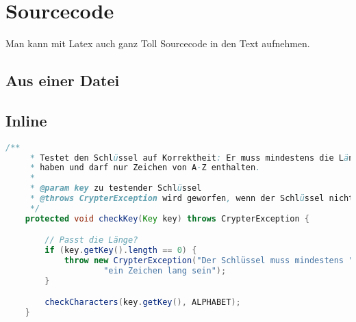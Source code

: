 \section{Sourcecode}

Man kann mit Latex auch ganz Toll Sourcecode in den Text aufnehmen.

\subsection{Aus einer Datei}




\subsection{Inline}

\begin{lstlisting}[language=Java]
    /**
     * Testet den Schlüssel auf Korrektheit: Er muss mindestens die Länge 1
     * haben und darf nur Zeichen von A-Z enthalten.
     *
     * @param key zu testender Schlüssel
     * @throws CrypterException wird geworfen, wenn der Schlüssel nicht OK ist.
     */
    protected void checkKey(Key key) throws CrypterException {

        // Passt die Länge?
        if (key.getKey().length == 0) {
            throw new CrypterException("Der Schlüssel muss mindestens " +
                    "ein Zeichen lang sein");
        }

        checkCharacters(key.getKey(), ALPHABET);
    }
\end{lstlisting}


